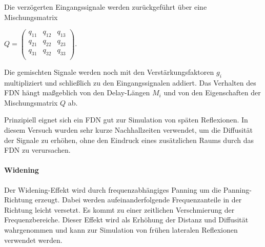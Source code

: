 Die verzögerten Eingangssignale werden zurückgeführt über eine Mischungsmatrix

$Q = \begin{pmatrix} q_{11} & q_{12} & q_{13} \\
                     q_{21} & q_{22} & q_{23} \\
                     q_{31} & q_{32} & q_{33} \\
     \end{pmatrix}$.

Die gemischten Signale werden noch mit den Verstärkungsfaktoren $g_i$ multipliziert und schließlich zu den Eingangssignalen addiert. Das Verhalten des FDN hängt maßgeblich von den Delay-Längen $M_i$ und von den Eigenschaften der Mischungsmatrix $Q$ ab.

Prinzipiell eignet sich ein FDN gut zur Simulation von späten Reflexionen. In diesem Versuch wurden sehr kurze Nachhallzeiten verwendet, um die Diffusität der Signale zu erhöhen, ohne den Eindruck eines zusätzlichen Raums durch das FDN zu verursachen.

\paragraph{Widening}
Der Widening-Effekt wird durch frequenzabhängiges Panning um die Panning-Richtung erzeugt. Dabei werden aufeinanderfolgende Frequenzanteile in der Richtung leicht versetzt. Es kommt zu einer zeitlichen Verschmierung der Frequenzbereiche. Dieser Effekt wird als Erhöhung der Distanz und Diffusität wahrgenommen und kann zur Simulation von frühen lateralen Reflexionen verwendet werden.
